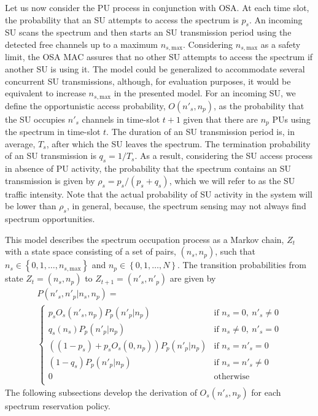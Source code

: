 Let us now consider the PU process in conjunction with OSA. At each time slot, the probability that an SU attempts to access the spectrum is $p_{s}$.
An incoming SU scans the spectrum and then starts an SU transmission period using the detected free channels up to a maximum $n_{s,\text{max}}$. Considering $n_{s,\text{max}}$ as a safety limit, the OSA MAC assures that no other SU attempts to access the spectrum if another SU is using it. The model could be generalized to accommodate several concurrent SU transmissions, although, for evaluation purposes, it would be equivalent to increase $n_{s,\text{max}}$ in the presented model.  
For an incoming SU, we define the opportunistic access probability, $O\left(n'_{s},n_{p}\right)$, as the probability that the SU occupies $n'_{s}$ channels in time-slot $t+1$ given that there are $n_{p}$ PUs using the spectrum in time-slot $t$.
The duration of an SU transmission period is, in average, $T_{s}$, after which the SU leaves the spectrum. The termination probability of an SU transmission is $q_{s}=1/T_{s}$.
As a result, considering the SU access process in absence of PU activity, the probability that the spectrum contains an SU transmission is given by $\rho_{s}=p_{s}/(p_{s}+q_{s})$, which we will refer to as the SU traffic intensity. Note that the actual probability of SU activity in the system will be lower than $\rho_{s}$, in general, because, the spectrum sensing may not always find spectrum opportunities.


This model describes the spectrum occupation process as a Markov chain, $Z_{t}$ with a state space consisting of a set of pairs, $\left(n_{s},n_{p}\right)$, such that $n_{s} \in \left\{0,1,\dots,n_{s,\text{max}}\right\}$ and $n_{p} \in \left\{0,1,\dots,N\right\}$. 
The transition probabilities from state $Z_{t}=\left(n_{s},n_{p}\right)$ to $Z_{t+1}=\left(n'_{s},n'_{p}\right)$ are given by
\begin{equation}\label{TransitionProbabilities}
\begin{array}{l}
P\left(n'_{s},n'_{p}|n_{s},n_{p}\right) = \\
\begin{cases}
p_{s}O_{s}\left(n'_{s},n_{p}\right)P_{p}\left(n'_{p}|n_{p}\right)&\mbox{if } n_{s}=0,\:n'_{s}\neq0\\
q_{s}\left(n_{s}\right)P_{p}\left(n'_{p}|n_{p}\right)&\mbox{if } n_{s}\neq0,\:n'_{s} = 0\\
\left(\left(1-p_{s}\right) + p_{s}O_{s}\left(0,n_{p}\right)\right)P_{p}\left(n'_{p}|n_{p}\right)&\mbox{if } n_{s}=n'_{s}=0\\
\left(1-q_{s}\right)P_{p}\left(n'_{p}|n_{p}\right)&\mbox{if } n_{s}=n'_{s}\neq0\\
0&\mbox{otherwise}\\
\end{cases}
\end{array}
\end{equation}
The following subsections develop the derivation of $O_{s}\left(n'_{s},n_{p}\right)$ for each spectrum reservation policy.


